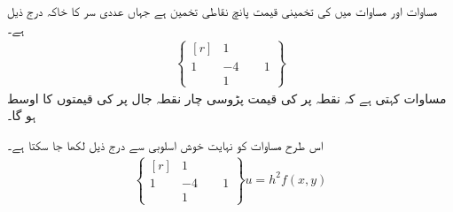 مساوات  اور مساوات  میں  کی تخمینی قیمت پانچ نقاطی تخمین ہے جہاں  عددی سر کا خاکہ درج ذیل ہے۔
\begin{align}\label{مساوات_اعدادی_جزوی_عمومی_ح}
\left \{ \begin{matrix*}[r] &1&\\1&-4&\phantom{-}1\\&1& \end{matrix*}\right \}
\end{align}
مساوات  کہتی ہے کہ نقطہ  پر  کی قیمت  پڑوسی چار نقطہ جال پر  کی قیمتوں کا اوسط ہو گا۔

اس طرح مساوات  کو نہایت خوش اسلوبی سے درج ذیل لکھا جا سکتا ہے۔ 
\begin{align*}
\left \{ \begin{matrix*}[r] &1&\\1&-4&\phantom{-}1\\&1& \end{matrix*}\right \}u=h^2f(x,y)
\end{align*}


